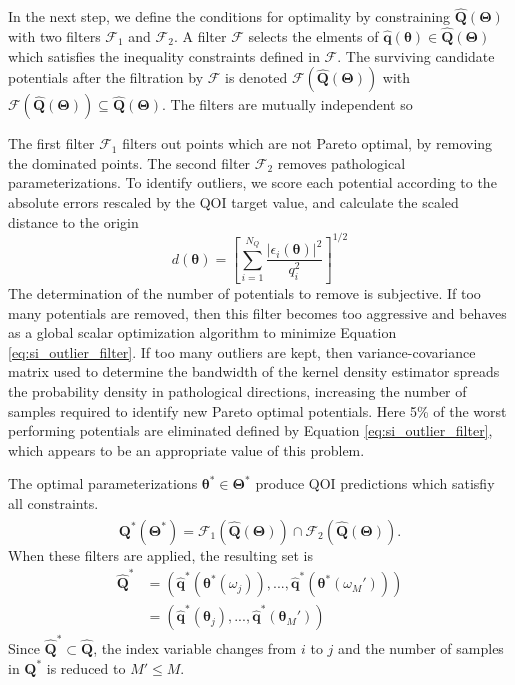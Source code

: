 In the next step, we define the conditions for optimality by constraining $\hat{\bm{Q}}(\bm{\Theta})$ with two filters $\mathcal{F}_1$ and $\mathcal{F}_2$. A filter $\mathcal{F}$ selects the elments of
$\hat{ \bm{q} }(\bm{\theta}) \in \hat{\bm{Q}}(\bm{\Theta})$
which satisfies the inequality constraints defined in $\mathcal{F}$.  The surviving candidate potentials after the filtration by $\mathcal{F}$ is denoted
$\mathcal{F}(\hat{\bm{Q}}(\bm{\Theta}))$ with
$\mathcal{F}(\hat{\bm{Q}}(\bm{\Theta})) \subseteq \hat{\bm{Q}}(\bm{\Theta})$.  The filters are mutually independent so

The first filter $\mathcal{F}_1$ filters out points which are not Pareto optimal, by removing the dominated points.  The second filter $\mathcal{F}_2$ removes pathological parameterizations.  To identify outliers, we score each potential according to the absolute errors rescaled by the QOI target value, and calculate the scaled distance to the origin
\begin{equation}
  \label{eq:si_outlier_filter}
	d(\bm{\theta})
  =
  \left[
    \sum_{i=1}^{N_Q} \frac{|\epsilon_{i}(\bm{\theta})|^2}
                          {q_i^2}
  \right]^{1/2}
\end{equation}
The determination of the number of potentials to remove is subjective.  If too many potentials are removed, then this filter becomes too aggressive and behaves as a global scalar optimization algorithm to minimize Equation \ref{eq:si_outlier_filter}.  If too many outliers are kept, then variance-covariance matrix used to determine the bandwidth of the kernel density estimator spreads the probability density in pathological directions, increasing the number of samples required to identify new Pareto optimal potentials.  Here 5\% of the worst performing potentials are eliminated defined by Equation \ref{eq:si_outlier_filter}, which appears to be an appropriate value of this problem.

The optimal parameterizations $\bm{\theta}^* \in \bm{\Theta}^*$ produce QOI predictions which satisfiy all constraints.
\begin{equation}
  \hat{\bm{Q}^*(\bm{\Theta}^*)}
  =
  \mathcal{F}_1(\hat{\bm{Q}}(\bm{\Theta}))
  \cap
  \mathcal{F}_2(\hat{\bm{Q}}(\bm{\Theta})).
\end{equation}
When these filters are applied, the resulting set is
\begin{subequations}
  \begin{align}
     \hat{\bm{Q}}^*
       &= (\hat{\bm{q}}^*(\bm{\theta}^*(\omega_j)),
           ...,
           \hat{\bm{q}}^*(\bm{\theta}^*(\omega_M'))
          )
      \label{eq:si_qoistar_seq_1} \\
       &= (\hat{\bm{q}}^*(\bm{\theta}_j),
           ...,
           \hat{\bm{q}}^*(\bm{\theta}_M')
          )
      \label{eq:si_qoistar_seq_2}
  \end{align}
\end{subequations}
Since $\hat{\bm{Q}}^* \subset \hat{\bm{Q}}$, the index variable changes from $i$ to $j$ and the number of samples in $\bm{Q}^*$ is reduced to $M' \leq M$.

